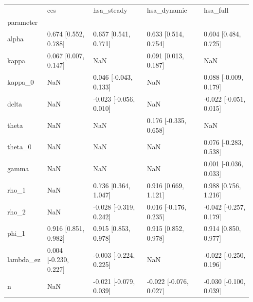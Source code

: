 \begin{tabular}{lllll}
\toprule
 & ces & hsa\_steady & hsa\_dynamic & hsa\_full \\
parameter &  &  &  &  \\
\midrule
alpha & 0.674 [0.552, 0.788] & 0.657 [0.541, 0.771] & 0.633 [0.514, 0.754] & 0.604 [0.484, 0.725] \\
kappa & 0.067 [0.007, 0.147] & NaN & 0.091 [0.013, 0.187] & NaN \\
kappa\_0 & NaN & 0.046 [-0.043, 0.133] & NaN & 0.088 [-0.009, 0.179] \\
delta & NaN & -0.023 [-0.056, 0.010] & NaN & -0.022 [-0.051, 0.015] \\
theta & NaN & NaN & 0.176 [-0.335, 0.658] & NaN \\
theta\_0 & NaN & NaN & NaN & 0.076 [-0.283, 0.538] \\
gamma & NaN & NaN & NaN & 0.001 [-0.036, 0.033] \\
rho\_1 & NaN & 0.736 [0.364, 1.047] & 0.916 [0.669, 1.121] & 0.988 [0.756, 1.216] \\
rho\_2 & NaN & -0.028 [-0.319, 0.242] & 0.016 [-0.176, 0.235] & -0.042 [-0.257, 0.179] \\
phi\_1 & 0.916 [0.851, 0.982] & 0.915 [0.853, 0.978] & 0.915 [0.852, 0.978] & 0.914 [0.850, 0.977] \\
lambda\_ez & 0.004 [-0.230, 0.227] & -0.003 [-0.224, 0.225] & NaN & -0.022 [-0.250, 0.196] \\
n & NaN & -0.021 [-0.079, 0.039] & -0.022 [-0.076, 0.027] & -0.030 [-0.100, 0.039] \\
\bottomrule
\end{tabular}
